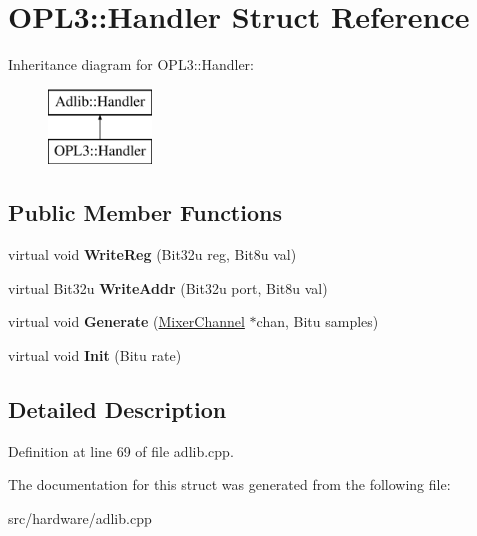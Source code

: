 \hypertarget{structOPL3_1_1Handler}{\section{O\-P\-L3\-:\-:Handler Struct Reference}
\label{structOPL3_1_1Handler}
}
Inheritance diagram for O\-P\-L3\-:\-:Handler\-:\begin{figure}[H]
\begin{center}
\leavevmode
\includegraphics[height=2.000000cm]{structOPL3_1_1Handler}
\end{center}
\end{figure}
\subsection*{Public Member Functions}
\begin{DoxyCompactItemize}
\item 
\hypertarget{structOPL3_1_1Handler_abd58ad3a3a13fcc8ef3e19bf1fd76bd1}{virtual void {\bfseries Write\-Reg} (Bit32u reg, Bit8u val)}\label{structOPL3_1_1Handler_abd58ad3a3a13fcc8ef3e19bf1fd76bd1}

\item 
\hypertarget{structOPL3_1_1Handler_aeb1af51c1839cc20712d4434077a7dcb}{virtual Bit32u {\bfseries Write\-Addr} (Bit32u port, Bit8u val)}\label{structOPL3_1_1Handler_aeb1af51c1839cc20712d4434077a7dcb}

\item 
\hypertarget{structOPL3_1_1Handler_ae5db8d97daf264ca7c1d4efd9a967323}{virtual void {\bfseries Generate} (\hyperlink{classMixerChannel}{Mixer\-Channel} $\ast$chan, Bitu samples)}\label{structOPL3_1_1Handler_ae5db8d97daf264ca7c1d4efd9a967323}

\item 
\hypertarget{structOPL3_1_1Handler_ac1b6b29e04d2c9bd45abad402a44e380}{virtual void {\bfseries Init} (Bitu rate)}\label{structOPL3_1_1Handler_ac1b6b29e04d2c9bd45abad402a44e380}

\end{DoxyCompactItemize}


\subsection{Detailed Description}


Definition at line 69 of file adlib.\-cpp.



The documentation for this struct was generated from the following file\-:\begin{DoxyCompactItemize}
\item 
src/hardware/adlib.\-cpp\end{DoxyCompactItemize}
